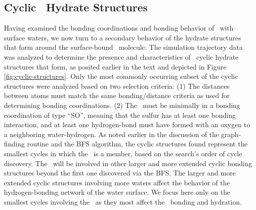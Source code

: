 \subsection{Cyclic \suldiox~Hydrate Structures}

Having examined the bonding coordinations and bonding behavior of \suldiox~with surface waters, we now turn to a secondary behavior of the hydrate structures that form around the surface-bound \suldiox~molecule. The simulation trajectory data was analyzed to determine the presence and characteristics of \suldiox~cyclic hydrate structures that form, as posited earlier in the text and depicted in Figure \ref{fig:cyclic-structures}. Only the most commonly occurring subset of the cyclic structures were analyzed based on two selection criteria: (1) The distances between atoms must match the same bonding/distance criteria as used for determining bonding coordinations. (2) The \suldiox~must be minimally in a bonding coordination of type ``SO'', meaning that the sulfur has at least one bonding interaction, and at least one hydrogen-bond must have formed with an oxygen to a neighboring water-hydrogen. As noted earlier in the discussion of the graph-finding routine and the BFS algorithm, the cyclic structures found represent the smallest cycles in which the \suldiox~is a member, based on the search's order of cycle discovery. The \suldiox~will be involved in other larger and more extended cyclic bonding structures beyond the first one discovered via the BFS. The larger and more extended cyclic structures involving more waters affect the behavior of the hydrogen-bonding network of the water surface. We focus here only on the smallest cycles involving the \suldiox~as they most affect the \suldiox~bonding and hydration.

